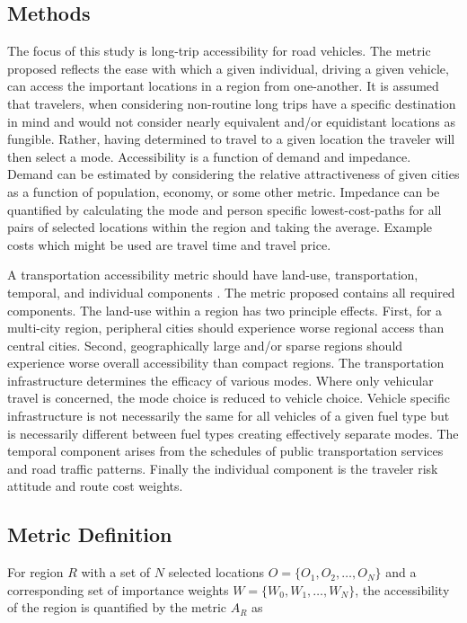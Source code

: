 \documentclass[11pt]{article}
\begin{document}
\begin{multicols}{2}
\section*{Methods}

The focus of this study is long-trip accessibility for road vehicles. The metric proposed reflects the ease with which a given individual, driving a given vehicle, can access the important locations in a region from one-another. It is assumed that travelers, when considering non-routine long trips have a specific destination in mind and would not consider nearly equivalent and/or equidistant locations as fungible. Rather, having determined to travel to a given location the traveler will then select a mode. Accessibility is a function of demand and impedance. Demand can be estimated by considering the relative attractiveness of given cities as a function of population, economy, or some other metric. Impedance can be quantified by calculating the mode and person specific lowest-cost-paths for all pairs of selected locations within the region and taking the average. Example costs which might be used are travel time and travel price.

A transportation accessibility metric should have land-use, transportation, temporal, and individual components \cite{Karst_2003}. The metric proposed contains all required components. The land-use within a region has two principle effects. First, for a multi-city region, peripheral cities should experience worse regional access than central cities. Second, geographically large and/or sparse regions should experience worse overall accessibility than compact regions. The transportation infrastructure determines the efficacy of various modes. Where only vehicular travel is concerned, the mode choice is reduced to vehicle choice. Vehicle specific infrastructure is not necessarily the same for all vehicles of a given fuel type but is necessarily different between fuel types creating effectively separate modes. The temporal component arises from the schedules of public transportation services and road traffic patterns. Finally the individual component is the traveler risk attitude and route cost weights.

\subsection*{Metric Definition}

For region $R$ with a set of $N$ selected locations $O = \{O_1, O_2, \dots, O_N\}$ and a corresponding set of importance weights $W = \{W_0, W_1, \dots, W_N\}$, the accessibility of the region is quantified by the metric $A_{R}$ as


\end{multicols}
\end{document}
